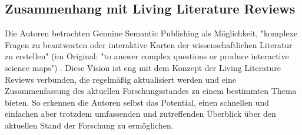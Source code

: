 \subsection{Zusammenhang mit Living Literature Reviews}
\label{subsec:zusammenhang-mit-living-literature-reviews}

Die Autoren betrachten Genuine Semantic Publishing als Möglichkeit, "komplexe Fragen zu beantworten oder interaktive Karten der wissenschaftlichen Literatur zu erstellen" (im Original: "to answer complex questions or produce interactive science maps") \cite{kuhn2017genuine}.
Diese Vision ist eng mit dem Konzept der Living Literature Reviews verbunden, die regelmäßig aktualisiert werden und eine Zusammenfassung des aktuellen Forschungsstandes zu einem bestimmten Thema bieten.
So erkennen die Autoren selbst das Potential, einen schnellen und einfachen aber trotzdem umfassenden und zutreffenden Überblick über den aktuellen Stand der Forschung zu ermöglichen.
